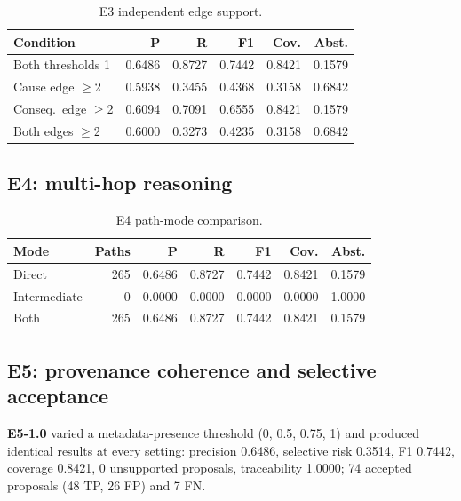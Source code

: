 \documentclass[10pt,twocolumn,a4paper]{extarticle}
\begin{document}
\begin{table}[t]
\centering
\caption{E3 independent edge support.}
\label{tab:e3}
\begin{tabular}{@{}l rrr rr@{}}
\toprule
\textbf{Condition} & \textbf{P} & \textbf{R} & \textbf{F1} & \textbf{Cov.} & \textbf{Abst.}\\
\midrule
Both thresholds 1 & 0.6486 & 0.8727 & 0.7442 & 0.8421 & 0.1579\\
Cause edge $\ge$2 & 0.5938 & 0.3455 & 0.4368 & 0.3158 & 0.6842\\
Conseq.\ edge $\ge$2 & 0.6094 & 0.7091 & 0.6555 & 0.8421 & 0.1579\\
Both edges $\ge$2 & 0.6000 & 0.3273 & 0.4235 & 0.3158 & 0.6842\\
\bottomrule
\end{tabular}
\end{table}

\subsection{E4: multi-hop reasoning}
\begin{table}[t]
\centering
\caption{E4 path-mode comparison.}
\label{tab:e4}
\begin{tabular}{@{}l r rrr rr@{}}
\toprule
\textbf{Mode} & \textbf{Paths} & \textbf{P} & \textbf{R} & \textbf{F1} & \textbf{Cov.} & \textbf{Abst.}\\
\midrule
Direct & 265 & 0.6486 & 0.8727 & 0.7442 & 0.8421 & 0.1579\\
Intermediate & 0 & 0.0000 & 0.0000 & 0.0000 & 0.0000 & 1.0000\\
Both & 265 & 0.6486 & 0.8727 & 0.7442 & 0.8421 & 0.1579\\
\bottomrule
\end{tabular}
\end{table}

\subsection{E5: provenance coherence and selective acceptance}
\textbf{E5-1.0} varied a metadata-presence threshold (0, 0.5, 0.75, 1) and produced identical results at every setting: precision 0.6486, selective risk 0.3514, F1 0.7442, coverage 0.8421, 0 unsupported proposals, traceability 1.0000; 74 accepted proposals (48 TP, 26 FP) and 7 FN.
\end{document}

